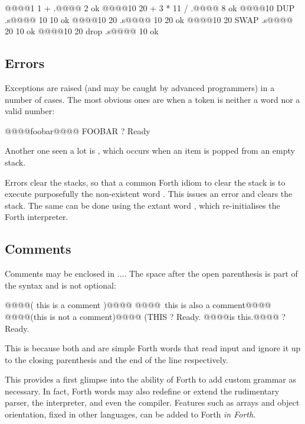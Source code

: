\begin{intrcode}
@@@@1 1 + .@@@@  2 ok
@@@@10 20 + 3 * 11 / .@@@@  8 ok
@@@@10 DUP .s@@@@  10 10 ok
@@@@10 20 .s@@@@  10 20 ok
@@@@10 20 SWAP .s@@@@  20 10 ok
@@@@10 20 drop .s@@@@  10 ok
\end{intrcode}


\subsection{Errors}

Exceptions are raised (and may be caught by advanced programmers) in a number
of cases. The most obvious ones are when a token is neither a word nor a valid
number:

\begin{intrcode}
@@@@foobar@@@@ FOOBAR  ? Ready
\end{intrcode}

\noindent Another one seen a lot is , which occurs when an item
is popped from an empty stack.

Errors clear the stacks, so that a common Forth idiom to clear the stack is to
execute purposefully the non-existent word . This issues an error and
clears the stack. The same can be done using the extant word , which
re-initialises the Forth interpreter.


\subsection{Comments}

Comments may be enclosed in \cftin{(\space}$\dots$\cftin{\space)}. The space
after the open parenthesis is part of the syntax and is not optional:

\begin{intrcode}
@@@@( this is a comment )@@@@
@@@@\ this is also a comment@@@@
@@@@(this is not a comment)@@@@  (THIS  ? Ready.
@@@@\neither is this.@@@@  \NEITHER  ? Ready.
\end{intrcode}

\noindent This is because both \fw{(} and \fw{\textbackslash} are simple Forth words that
read input and ignore it up to the closing parenthesis and the end of the line
respectively.

This provides a first glimpse into the ability of Forth to add custom grammar
as necessary. In fact, Forth words may also redefine or extend the rudimentary
parser, the interpreter, and even the compiler. Features such as arrays and
object orientation, fixed in other languages, can be added to Forth {\em in
  Forth}.

